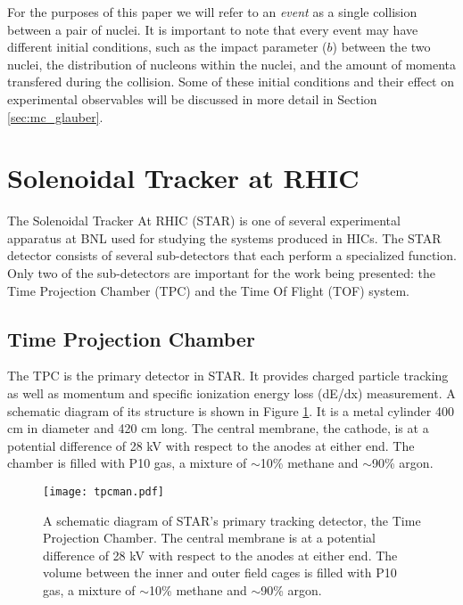 	For the purposes of this paper we will refer to an \textit{event} as a single collision between a pair of nuclei. It is important to note that every event may have different initial conditions, such as the impact parameter ($b$) between the two nuclei, the distribution of nucleons within the nuclei, and the amount of momenta transfered during the collision. Some of these initial conditions and their effect on experimental observables will be discussed in more detail in Section \ref{sec:mc_glauber}. 


\section{Solenoidal Tracker at RHIC}
	\label{sec:star}
	The Solenoidal Tracker At RHIC (STAR) is one of several experimental apparatus at BNL used for studying the systems produced in HICs. The STAR detector consists of several sub-detectors that each perform a specialized function. Only two of the sub-detectors are important for the work being presented: the Time Projection Chamber (TPC) and the Time Of Flight (TOF) system\cite{anderson_star_2003}\cite{llope_tofppvpd_2004}. 

	\subsection{ Time Projection Chamber }
		The TPC is the primary detector in STAR. It provides charged particle tracking as well as momentum and specific ionization energy loss (dE/dx) measurement. A schematic diagram of its structure is shown in Figure \ref{fig:tpcman}. It is a metal cylinder 400 cm in diameter and 420 cm long. The central membrane, the cathode, is at a potential difference of 28 kV with respect to the anodes at either end. The chamber is filled with P10 gas, a mixture of $\sim$10\% methane and $\sim$90\% argon\cite{anderson_star_2003}. 

		\begin{figure}
			\centering 
			\texttt{[image: tpcman.pdf]} 
			 
			\caption{ \label{fig:tpcman} A schematic diagram of STAR's primary tracking detector, the Time Projection Chamber. The central membrane is at a potential difference of 28 kV with respect to the anodes at either end. The volume between the inner and outer field cages is filled with P10 gas, a mixture of $\sim$10\% methane and $\sim$90\% argon\cite{anderson_star_2003}. } 
		\end{figure}

